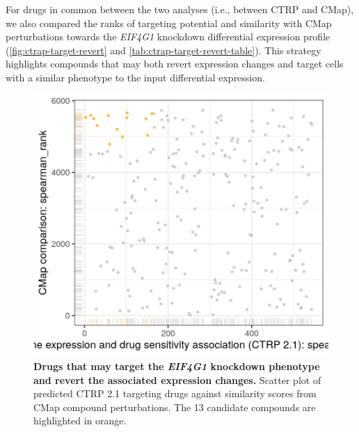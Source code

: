
For drugs in common between the two analyses (i.e., between CTRP and CMap), we also compared the ranks of targeting potential and similarity with CMap perturbations towards the \emph{EIF4G1} knockdown differential expression profile (\autoref{fig:ctrap-target-revert} and \autoref{tab:ctrap-target-revert-table}). This strategy highlights compounds that may both revert expression changes and target cells with a similar phenotype to the input differential expression. 

\begin{figure}[!h]
	\centering
	\includegraphics[width=.5\textwidth]{images/ctrap/eif4g1-target-revert}
    \caption[Plot of drugs that may target the \emph{EIF4G1} knockdown expression changes]{\textbf{Drugs that may target the \emph{EIF4G1} knockdown phenotype and revert the associated expression changes.} Scatter plot of predicted CTRP 2.1 targeting drugs against similarity scores from CMap compound perturbations. The 13 candidate compounds are highlighted in orange.}
    \label{fig:ctrap-target-revert}
\end{figure}

